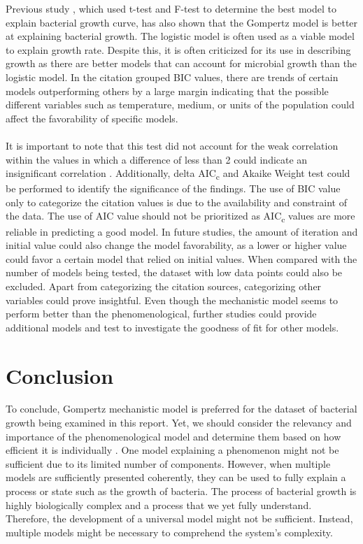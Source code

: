 \documentclass[11pt]{article}
\begin{document}
    Previous study \cite{zwietering1990modeling}, which used t-test and F-test to determine the best model to explain bacterial growth curve, has also shown that the Gompertz model is better at explaining bacterial growth. The logistic model is often used as a viable model to explain growth rate. Despite this, it is often criticized for its use in describing growth\cite{kingsland1982refractory} as there are better models that can account for microbial growth than the logistic model.
    In the citation grouped BIC values, there are trends of certain models outperforming others by a large margin indicating that the possible different variables such as temperature, medium, or units of the population could affect the favorability of specific models. 
    \\
    \\
    It is important to note that this test did not account for the weak correlation within the values in which a difference of less than 2 could indicate an insignificant correlation \cite{mazerolle2006improving}.
    Additionally, delta AIC\textsubscript{c} and Akaike Weight test could be performed to identify the significance of the findings. 
    The use of BIC value only to categorize the citation values is due to the availability and constraint of the data. The use of AIC value should not be prioritized as AIC\textsubscript{c} values are more reliable in predicting a good model. 
    In future studies, the amount of iteration and initial value could also change the model favorability, as a lower or higher value could favor a certain model that relied on initial values.
    When compared with the number of models being tested, the dataset with low data points could also be excluded.
    Apart from categorizing the citation sources, categorizing other variables could prove insightful.
    Even though the mechanistic model seems to perform better than the phenomenological, further studies could provide additional models and test to investigate the goodness of fit for other models.

    \section{Conclusion}
    To conclude, Gompertz mechanistic model is preferred for the dataset of bacterial growth being examined in this report.
    Yet, we should consider the relevancy and importance of the phenomenological model and determine them based on how efficient it is individually \cite{white2019should}.
    One model explaining a phenomenon might not be sufficient due to its limited number of components. However, when multiple models are sufficiently presented coherently, they can be used to fully explain a process or state \cite{levins1966strategy} such as the growth of bacteria.
    The process of bacterial growth is highly biologically complex and a process that we yet fully understand. 
    Therefore, the development of a universal model might not be sufficient. Instead, multiple models might be necessary to comprehend the system's complexity.

 \newpage

\end{document}
